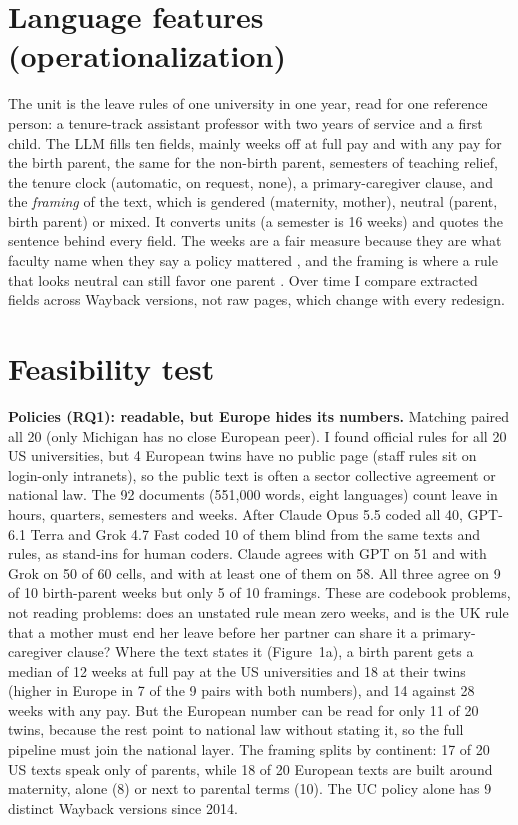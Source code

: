 \documentclass[10pt,twocolumn]{article}
\begin{document}
\section{Language features (operationalization)}
The unit is the leave rules of one university in one year, read for one reference person: a tenure-track assistant professor with two years of service and a first child. The LLM fills ten fields, mainly weeks off at full pay and with any pay for the birth parent, the same for the non-birth parent, semesters of teaching relief, the tenure clock (automatic, on request, none), a primary-caregiver clause, and the \emph{framing} of the text, which is gendered (maternity, mother), neutral (parent, birth parent) or mixed. It converts units (a semester is 16 weeks) and quotes the sentence behind every field. The weeks are a fair measure because they are what faculty name when they say a policy mattered \citep{morgan2021}, and the framing is where a rule that looks neutral can still favor one parent \citep{antecol2018}. Over time I compare extracted fields across Wayback versions, not raw pages, which change with every redesign.

\section{Feasibility test}
\textbf{Policies (RQ1): readable, but Europe hides its numbers.} Matching paired all 20 (only Michigan has no close European peer). I found official rules for all 20 US universities, but 4 European twins have no public page (staff rules sit on login-only intranets), so the public text is often a sector collective agreement or national law. The 92 documents (551,000 words, eight languages) count leave in hours, quarters, semesters and weeks. After Claude Opus 5.5 coded all 40, GPT-6.1 Terra and Grok 4.7 Fast coded 10 of them blind from the same texts and rules, as stand-ins for human coders. Claude agrees with GPT on 51 and with Grok on 50 of 60 cells, and with at least one of them on 58. All three agree on 9 of 10 birth-parent weeks but only 5 of 10 framings. These are codebook problems, not reading problems: does an unstated rule mean zero weeks, and is the UK rule that a mother must end her leave before her partner can share it a primary-caregiver clause? Where the text states it (Figure~1a), a birth parent gets a median of 12 weeks at full pay at the US universities and 18 at their twins (higher in Europe in 7 of the 9 pairs with both numbers), and 14 against 28 weeks with any pay. But the European number can be read for only 11 of 20 twins, because the rest point to national law without stating it, so the full pipeline must join the national layer. The framing splits by continent: 17 of 20 US texts speak only of parents, while 18 of 20 European texts are built around maternity, alone (8) or next to parental terms (10). The UC policy alone has 9 distinct Wayback versions since 2014.
\end{document}
